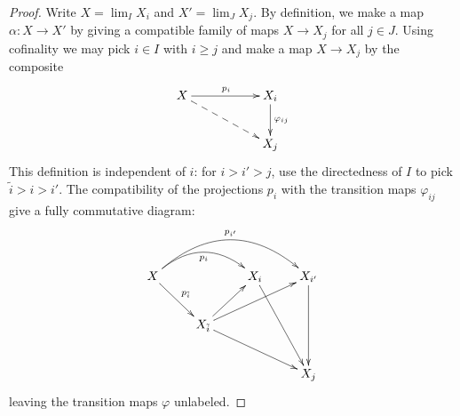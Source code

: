       \begin{proof}
        Write $X=\lim_I X_i$ and $X'=\lim_J X_j$.
        By definition, we make a map $\alpha:X\rightarrow X'$ by giving a compatible family of maps $X\rightarrow X_j$ for all $j\in J$.
        Using cofinality we may pick $i\in I$ with $i\ge j$ and make a map $X\rightarrow X_j$ by the composite
        \begin{displaymath}
          \xymatrix{
            X \ar[rr]^{p_i} \ar@{-->}[drr] && X_i \ar[d]^{\varphi_{ij}} \\
            && X_j
          }
        \end{displaymath}
        This definition is independent of $i$: for $i>i'>j$, use the directedness of $I$ to pick $\tilde{i}>i>i'$.
        The compatibility of the projections $p_i$ with the transition maps $\varphi_{ij}$ give a fully commutative diagram:
        \begin{displaymath}
          \xymatrix{
            X \ar@/^20pt/[rr]_{p_i} \ar@/^30pt/[rrr]^{p_{i'}} \ar[dr]^{p_{\tilde{i}}} && X_i \ar[ddr] & X_{i'} \ar[dd] \\
            & X_{\tilde{i}} \ar[ur] \ar[urr] \ar[drr] \\
            &&& X_j
          }
        \end{displaymath}
        leaving the transition maps $\varphi$ unlabeled.


\end{proof}

